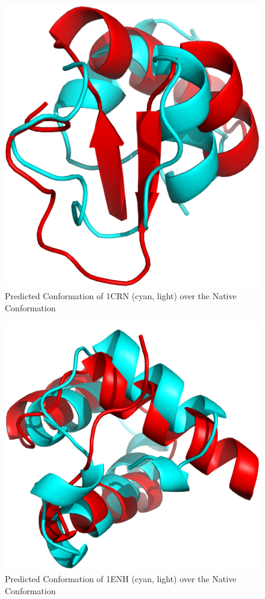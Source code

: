 \begin{figure}[ht]
    \centering
    \includegraphics[width=\linewidth]{Figuras/1crn_.png}
    \caption{Predicted Conformation of 1CRN (cyan, light) over the Native Conformation}
    \label{fig:1crn-visual}
\end{figure}

\begin{figure}[ht]
    \centering
    \includegraphics[width=\linewidth]{Figuras/1enh_.png}
    \caption{Predicted Conformation of 1ENH (cyan, light) over the Native Conformation}
    \label{fig:1enh-visual}
\end{figure}

